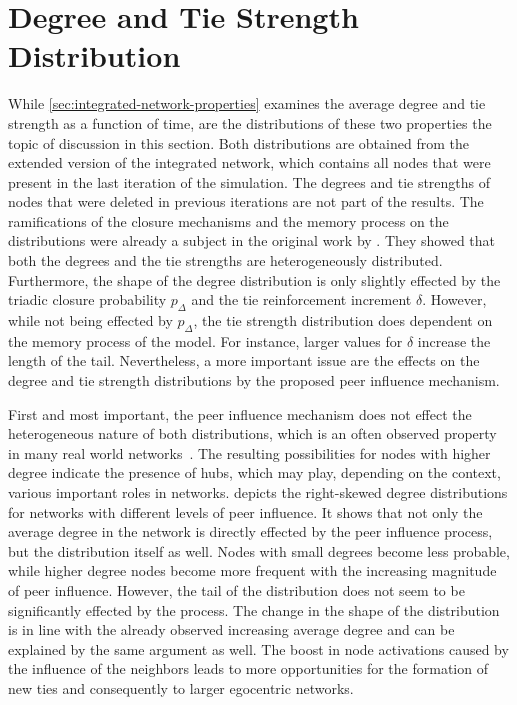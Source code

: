 

\section{Degree and Tie Strength Distribution}
\label{sec:weight-and-degree-distribution}

While \cref{sec:integrated-network-properties} examines the average degree and tie strength as a function of time, are the distributions of these two properties the topic of discussion in this section.
Both distributions are obtained from the extended version of the integrated network, which contains all nodes that were present in the last iteration of the simulation.
The degrees and tie strengths of nodes that were deleted in previous iterations are not part of the results.
The ramifications of the closure mechanisms and the memory process on the distributions were already a subject in the original work by \citet{Laurent2015}.
They showed that both the degrees and the tie strengths are heterogeneously distributed.
Furthermore, the shape of the degree distribution is only slightly effected by the triadic closure probability \( p_{\Delta} \) and the tie reinforcement increment \( \delta \).
However, while not being effected by \( p_{\Delta} \), the tie strength distribution does dependent on the memory process of the model.
For instance, larger values for \( \delta \) increase the length of the tail.
Nevertheless, a more important issue are the effects on the degree and tie strength distributions by the proposed peer influence mechanism.

First and most important, the peer influence mechanism does not effect the heterogeneous nature of both distributions, which is an often observed property in many real world networks~\cite{Barabasi2002, Karsai2014}.
The resulting possibilities for nodes with higher degree indicate the presence of hubs, which may play, depending on the context, various important roles in networks.
 depicts the right-skewed degree distributions for networks with different levels of peer influence.
It shows that not only the average degree in the network is directly effected by the peer influence process, but the distribution itself as well.
Nodes with small degrees become less probable, while higher degree nodes become more frequent with the increasing magnitude of peer influence.
However, the tail of the distribution does not seem to be significantly effected by the process.
The change in the shape of the distribution is in line with the already observed increasing average degree and can be explained by the same argument as well.
The boost in node activations caused by the influence of the neighbors leads to more opportunities for the formation of new ties and consequently to larger egocentric networks.


